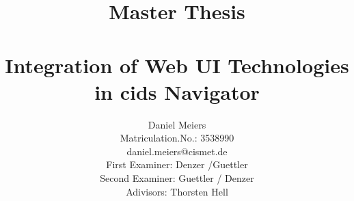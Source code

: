 

\title{%
\large Master Thesis\\
\\[20mm]
{\LARGE Integration of Web UI Technologies in cids Navigator}\\[30mm]
}


\author{%
Daniel Meiers\\
Matriculation.No.: 3538990\\
daniel.meiers@cismet.de\\[15mm]
First Examiner: Denzer /Guettler\\
Second Examiner: Guettler / Denzer\\
Adivisors: Thorsten Hell\\[20mm]
}





 




